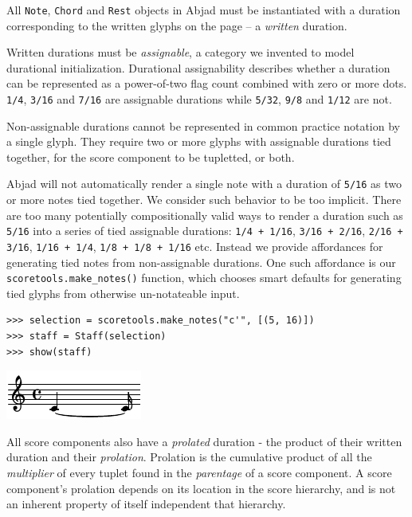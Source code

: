 All \texttt{Note}, \texttt{Chord} and \texttt{Rest} objects in Abjad must be
instantiated with a duration corresponding to the written glyphs on the page --
a \emph{written} duration.

Written durations must be \emph{assignable}, a category we invented to model
durational initialization. Durational assignability describes whether a
duration can be represented as a power-of-two flag count combined with zero or
more dots. \texttt{1/4}, \texttt{3/16} and \texttt{7/16} are assignable
durations while \texttt{5/32}, \texttt{9/8} and \texttt{1/12} are not.

Non-assignable durations cannot be represented in common practice notation by a
single glyph. They require two or more glyphs with assignable durations tied
together, for the score component to be tupletted, or both.

Abjad will not automatically render a single note with a duration of
\texttt{5/16} as two or more notes tied together. We consider such behavior to
be too implicit. There are too many potentially compositionally valid ways to
render a duration such as \texttt{5/16} into a series of tied assignable
durations: \texttt{1/4 + 1/16}, \texttt{3/16 + 2/16}, \texttt{2/16 + 3/16},
\texttt{1/16 + 1/4}, \texttt{1/8 + 1/8 + 1/16} etc. Instead we provide
affordances for generating tied notes from non-assignable durations. One such
affordance is our \texttt{scoretools.make\_notes()} function, which chooses
smart defaults for generating tied glyphs from otherwise un-notateable input.

\begin{lstlisting}
>>> selection = scoretools.make_notes("c'", [(5, 16)])
>>> staff = Staff(selection)
>>> show(staff)
\end{lstlisting}

\includegraphics[scale=1.0]{images/section_2_notational_isomorphism-3.pdf}


All score components also have a \emph{prolated} duration - the product of
their written duration and their \emph{prolation}. Prolation is the cumulative
product of all the \emph{multiplier} of every tuplet found in the
\emph{parentage} of a score component. A score component's prolation depends on
its location in the score hierarchy, and is not an inherent property of itself
independent that hierarchy.

